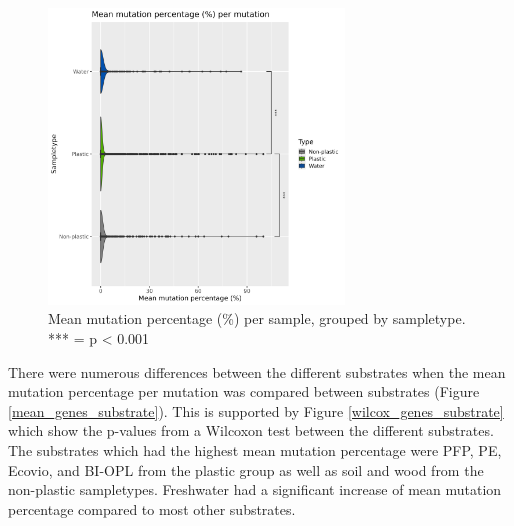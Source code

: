 \begin{figure}[h!]
    \centering
    \includegraphics[width = 0.7\textwidth]{figure/mean_genes_sampletype.png}
    \caption{Mean mutation percentage (\%) per sample, grouped by sampletype. *** = p < 0.001}
    \label{mean_genes_sampletype}
\end{figure}

There were numerous differences between the different substrates when the mean mutation percentage per mutation was compared between substrates (Figure \ref{mean_genes_substrate}). This is supported by Figure \ref{wilcox_genes_substrate} which show the p-values from a Wilcoxon test between the different substrates.
The substrates which had the highest mean mutation percentage were PFP, PE, Ecovio, and BI-OPL from the plastic group as well as soil and wood from the non-plastic sampletypes. 
Freshwater had a significant increase of mean mutation percentage compared to most other substrates.

